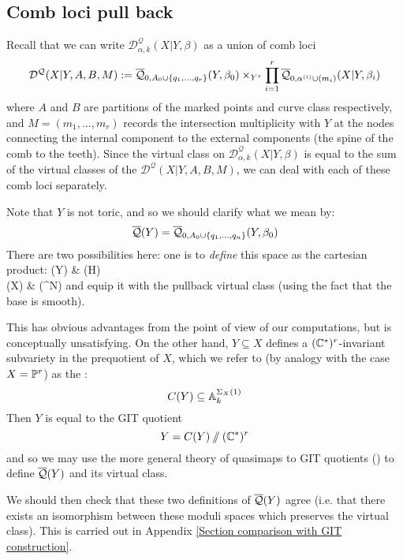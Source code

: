 \subsection{Comb loci pull back}
Recall that we can write $\mathcal D^\mathcal{Q}_{\alpha,k}(X|Y,\beta)$ as a union of comb loci
\begin{equation*} \mathcal D^{\mathcal{Q}}(X|Y,A,B,M) := \overline{\mathcal Q}_{0,A_0 \cup \{q_1, \ldots, q_r\}}(Y,\beta_0) \times_{Y^r} \prod_{i=1}^r \overline{\mathcal Q}_{0,\alpha^{(i)}\cup (m_i)}(X|Y,\beta_i) \end{equation*}
where $A$ and $B$ are partitions of the marked points and curve class respectively, and $M=(m_1,\ldots,m_r)$ records the intersection multiplicity with $Y$ at the nodes connecting the internal component to the external components (the spine of the comb to the teeth). Since the virtual class on $\mathcal D^\mathcal{Q}_{\alpha,k}(X|Y,\beta)$ is equal to the sum of the virtual classes of the $\mathcal D^{\mathcal{Q}}(X|Y,A,B,M)$, we can deal with each of these comb loci separately.


\begin{remark} \label{GIT comparison remark} Note that $Y$ is not toric, and so we should clarify what we mean by:
\begin{equation*} \overline{\mathcal{Q}}(Y) = \overline{\mathcal Q}_{0,A_0 \cup \{ q_1, \ldots, q_n \}}(Y,\beta_0) \end{equation*}
There are two possibilities here: one is to \emph{define} this space as the cartesian product:
\bcd
{}(Y) \ar[r] \ar[d]  & (H) \ar[d] \\
(X) \ar[r] & (\PP^N)
\ecd
and equip it with the pullback virtual class (using the fact that the base is smooth).

This has obvious advantages from the point of view of our computations, but is conceptually unsatisfying. On the other hand, $Y \subseteq X$ defines a $(\mathbb{C}^*)^r$-invariant subvariety in the prequotient of $X$, which we refer to (by analogy with the case $X=\mathbb P^r$) as the :
\begin{equation*} C(Y) \subseteq \mathbb{A}_k^{\Sigma_X(1)} \end{equation*}
Then $Y$ is equal to the GIT quotient
\begin{equation*} Y = C(Y) \sslash (\mathbb{C}^*)^r \end{equation*}
and so we may use the more general theory of quasimaps to GIT quotients (\cite{CFKM}) to define $\overline{\mathcal{Q}}(Y)$ and its virtual class.

We should then check that these two definitions of $\overline{\mathcal{Q}}(Y)$ agree (i.e. that there exists an isomorphism between these moduli spaces which preserves the virtual class). This is carried out in Appendix \ref{Section comparison with GIT construction}.
\end{remark}

